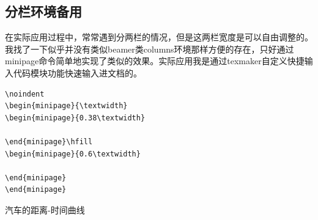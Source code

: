 \documentclass[11pt,oneside]{book}
\begin{document}
\subsection{分栏环境备用}
在实际应用过程中，常常遇到分两栏的情况，但是这两栏宽度是可以自由调整的。我找了一下似乎并没有类似beamer类columns环境那样方便的存在，只好通过minipage命令简单地实现了类似的效果。实际应用我是通过texmaker自定义快捷输入代码模块功能快速输入进文档的。
\begin{Verbatim}
\noindent
\begin{minipage}{\textwidth}
\begin{minipage}{0.38\textwidth}

\end{minipage}\hfill
\begin{minipage}{0.6\textwidth}

\end{minipage} 
\end{minipage} 
\end{Verbatim}


\noindent
\begin{minipage}{\textwidth}
\begin{minipage}{0.3\textwidth}
\begin{table}[H]
\centering
\medskip 
{}
\caption*{表 2-1}
\end{table}

\end{minipage}\hfill
\begin{minipage}{0.7\textwidth}
\begin{linefig}[0.9]{汽车的距离-时间曲线}
\caption{汽车的距离-时间曲线}
\label{fig:汽车的距离-时间曲线}
\end{linefig}
\end{minipage} 
\end{minipage} 
\end{document}
